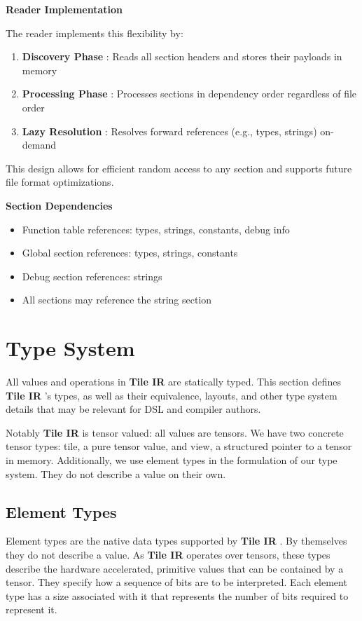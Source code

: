 \documentclass{article}
\begin{document}
\textbf{Reader Implementation}


The reader implements this flexibility by:


\begin{enumerate}
\item \textbf{Discovery Phase} : Reads all section headers and stores their payloads in memory
\item \textbf{Processing Phase} : Processes sections in dependency order regardless of file order
\item \textbf{Lazy Resolution} : Resolves forward references (e.g., types, strings) on-demand

\end{enumerate}
This design allows for efficient random access to any section and supports future file format optimizations.


\textbf{Section Dependencies}


\begin{itemize}
\item Function table references: types, strings, constants, debug info
\item Global section references: types, strings, constants
\item Debug section references: strings
\item All sections may reference the string section
\end{itemize}

\newpage
\section{Type System}

All values and operations in \textbf{Tile IR} are statically typed. This section defines \textbf{Tile IR} 's types, as well as their equivalence, layouts, and other type system details that may be relevant for DSL and compiler authors.


Notably \textbf{Tile IR} is tensor valued: all values are tensors. We have two concrete tensor types: tile, a pure tensor value, and view, a structured pointer to a tensor in memory. Additionally, we use element types in the formulation of our type system. They do not describe a value on their own.


\subsection{Element Types}

Element types are the native data types supported by \textbf{Tile IR} . By themselves they do not describe a value. As \textbf{Tile IR} operates over tensors, these types describe the hardware accelerated, primitive values that can be contained by a tensor. They specify how a sequence of bits are to be interpreted. Each element type has a size associated with it that represents the number of bits required to represent it.
\end{document}
